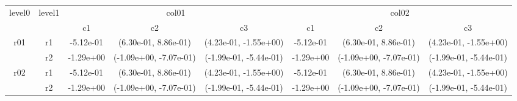 \begin{tabular}{cccccccc}
\toprule
\multirow{2}{*}{level0} & \multirow{2}{*}{level1}&\multicolumn{3}{c}{col01}&\multicolumn{3}{c}{col02}\tabularnewline
\cmidrule(lr){3-5}
\cmidrule(lr){6-8}
&&c1&c2&c3&c1&c2&c3\tabularnewline
\midrule
\midrule
\multirow{2}{*}{r01}&r1&-5.12e-01& (6.30e-01, 8.86e-01)& (4.23e-01, -1.55e+00)&-5.12e-01& (6.30e-01, 8.86e-01)& (4.23e-01, -1.55e+00)\tabularnewline
&r2&-1.29e+00& (-1.09e+00, -7.07e-01)& (-1.99e-01, -5.44e-01)&-1.29e+00& (-1.09e+00, -7.07e-01)& (-1.99e-01, -5.44e-01)\tabularnewline
\midrule
\multirow{2}{*}{r02}&r1&-5.12e-01& (6.30e-01, 8.86e-01)& (4.23e-01, -1.55e+00)&-5.12e-01& (6.30e-01, 8.86e-01)& (4.23e-01, -1.55e+00)\tabularnewline
&r2&-1.29e+00& (-1.09e+00, -7.07e-01)& (-1.99e-01, -5.44e-01)&-1.29e+00& (-1.09e+00, -7.07e-01)& (-1.99e-01, -5.44e-01)\tabularnewline
\bottomrule
\end{tabular}
